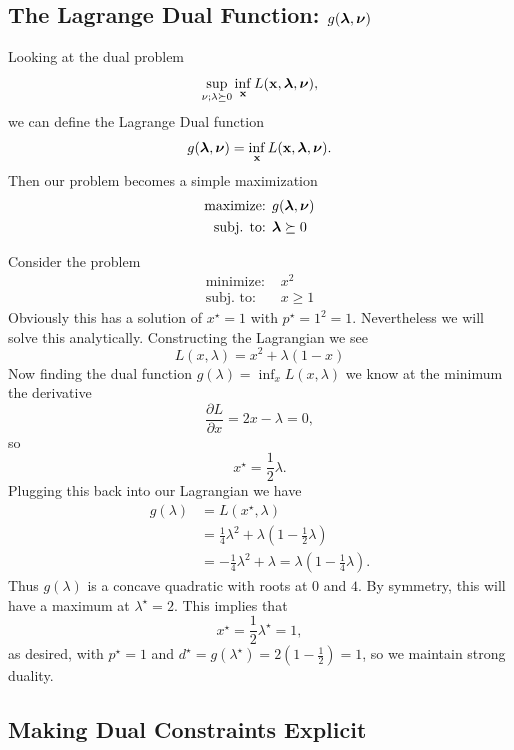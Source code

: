 \documentclass{article}
\begin{document}
\subsection{The Lagrange Dual Function: $g(\hbox{\boldmath$\lambda$}, \hbox{\boldmath$\nu$})$}

Looking at the dual problem
\[
    \sup_{\nu; \lambda \succeq 0}\inf_{\bf x} L({\bf x}, \hbox{\boldmath$\lambda$}, \hbox{\boldmath$\nu$}),
\]
we can define the Lagrange Dual function
\[
    g(\hbox{\boldmath$\lambda$}, \hbox{\boldmath$\nu$}) = \inf_{\bf x} L({\bf x}, \hbox{\boldmath$\lambda$}, \hbox{\boldmath$\nu$}).
\]
Then our problem becomes a simple maximization
\begin{align*}
    \text{maximize: } & g(\hbox{\boldmath$\lambda$}, \hbox{\boldmath$\nu$})\\
    \text{subj. to: } & \hbox{\boldmath$\lambda$} \succeq 0\\
\end{align*}

\begin{example}
    Consider the problem
    \begin{align*}
        \text{minimize: } & x^2\\
        \text{subj. to: } & x \geq 1
    \end{align*}
    Obviously this has a solution of $x^\star = 1$ with
    $p^\star = 1^2=1$. Nevertheless we will solve this analytically.
    Constructing the Lagrangian we see
    \[
        L(x,\lambda) = x^2 + \lambda(1-x)
    \]
    Now finding the dual function $g(\lambda) = \inf_x L(x,\lambda)$ we know at the minimum
    the derivative
    \[
        \frac{\partial L}{\partial x} = 2x - \lambda = 0,
    \]
    so
    \[
        x^\star = \frac{1}{2}\lambda.
    \]
    Plugging this back into our Lagrangian we have
    \begin{align*}
        g(\lambda) &= L(x^\star, \lambda)\\
        &= \frac{1}{4}\lambda^2 + \lambda(1- \frac{1}{2}\lambda)\\
        &= -\frac{1}{4}\lambda^2 + \lambda = \lambda(1 - \frac{1}{4}\lambda).
    \end{align*}
    Thus $g(\lambda)$ is a concave quadratic with roots at $0$ and $4$. By
    symmetry, this will have a maximum at $\lambda^\star = 2$. This implies that
    \[
        x^\star = \frac{1}{2}\lambda^\star = 1,
    \]
    as desired, with $p^\star = 1$ and $d^\star = g(\lambda^\star) =
    2(1-\frac{1}{2}) = 1$, so we maintain strong duality.
\end{example}

\subsection{Making Dual Constraints Explicit}
\end{document}
